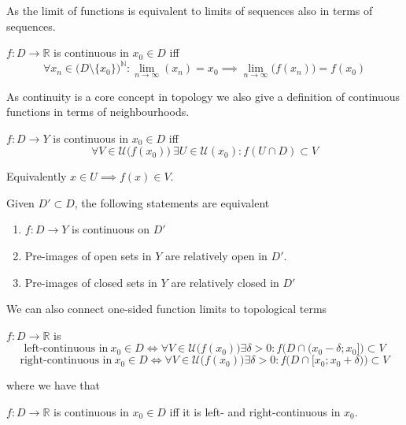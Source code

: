 As the limit of functions is equivalent to limits of sequences also in terms of sequences.
\begin{definition}\label{def:seq_cont}
   \(f: D \to \mathbb{R}\) is continuous in \(x_0 \in D\) iff
   \[\forall x_n \in \big(D\setminus\{x_0\}\big)^\mathbb{N}: \lim_{n \to \infty}(x_n) = x_0 \implies \lim_{n \to \infty}\big(f(x_n)\big) = f(x_0)\]
\end{definition}
As continuity is a core concept in topology we also give a definition of continuous functions in terms of neighbourhoods.
\begin{definition}\label{def:neigh_cont}
   \(f: D \to Y\) is continuous in \(x_0 \in D\) iff
   \[\forall V \in \mathcal{U}\big(f(x_0)\big)~\exists U \in \mathcal{U}(x_0): f(U \cap D) \subset V\]
\end{definition}
\begin{remark}
   Equivalently \(x \in U \implies f(x) \in V\).
\end{remark}

\begin{theorem}
   Given \(D' \subset D\), the following statements are equivalent
   \begin{enumerate}[label=\roman*, align=Center]
      \item \(f: D \to Y\) is continuous on \(D'\)
      \item Pre-images of open sets in \(Y\) are relatively open in \(D'\).
      \item Pre-images of closed sets in \(Y\) are relatively closed in \(D'\)
   \end{enumerate}
\end{theorem}
We can also connect one-sided function limits to topological terms
\begin{definition}
   \(f: D \to \mathbb{R}\) is
   \[\text{left-continuous in}~x_0 \in D \iff \forall V \in \mathcal{U}\big(f(x_0)\big) \exists \delta > 0: f\big(D \cap (x_0 - \delta; x_0]\big) \subset V\]
   \[\text{right-continuous in}~x_0 \in D \iff \forall V \in \mathcal{U}\big(f(x_0)\big) \exists \delta > 0: f\big(D \cap [x_0; x_0 + \delta)\big) \subset V\]
\end{definition}
where we have that
\begin{proposition}
   \(f: D \to \mathbb{R}\) is continuous in \(x_0 \in D\) iff it is left- and right-continuous in \(x_0\).
\end{proposition}

